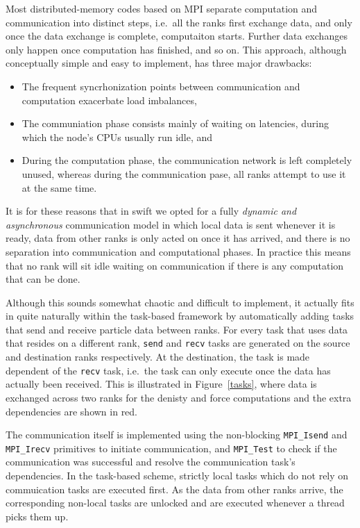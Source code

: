 \documentclass{sig-alternate-05-2015}
\newcommand{\swift}{{\sc swift}\xspace}
\begin{document}
Most distributed-memory codes based on MPI \cite{ref:Snir1998}
separate computation and communication into distinct steps, i.e.~all
the ranks first exchange data, and only once the data exchange is
complete, computaiton starts. Further data exchanges only happen
once computation has finished, and so on.
This approach, although conceptually simple and easy to implement,
has three major drawbacks:
\begin{itemize}
  \item The frequent syncrhonization points between communication
    and computation exacerbate load imbalances,
  \item The communiation phase consists mainly of waiting on
    latencies, during which the node's CPUs usually run idle, and
  \item During the computation phase, the communication network
    is left completely unused, whereas during the communication
    pase, all ranks attempt to use it at the same time.
\end{itemize}

It is for these reasons that in \swift we opted for a fully
{\em dynamic and asynchronous} communication model in which local
data is sent whenever it is ready, data from other ranks is
only acted on once it has arrived, and there is no separation into
communication and computational phases.
In practice this means that no rank will sit idle waiting on
communication if there is any computation that can be done.

Although this sounds somewhat chaotic and difficult to implement,
it actually fits in quite naturally within the task-based framework
by automatically adding tasks that send and receive particle data
between ranks.
For every task that uses data that resides on a different rank,
{\tt send} and {\tt recv} tasks are generated on the source
and destination ranks respectively.
At the destination, the task is made dependent of the {\tt recv}
task, i.e.~the task can only execute once the data has actually
been received.
This is illustrated in Figure~\ref{tasks}, where data is exchanged across
two ranks for the denisty and force computations and the extra
dependencies are shown in red.

The communication itself is implemented using the non-blocking
{\tt MPI\_Isend} and {\tt MPI\_Irecv} primitives to initiate
communication, and {\tt MPI\_Test} to check if the communication
was successful and resolve the communication task's dependencies.
In the task-based scheme, strictly local tasks which do not rely
on commuication tasks are executed first.
As the data from other ranks arrive, the corresponding non-local
tasks are unlocked and are executed whenever a thread picks them up.
\end{document}
